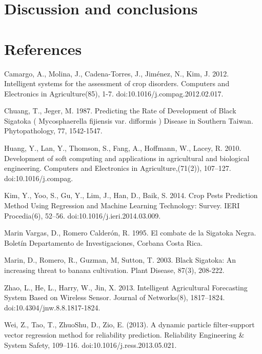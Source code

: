 \documentclass[review]{elsarticle}
\begin{document}
\section{Discussion and conclusions}

\section{References}

\begin{thebibliography}{1}


 Camargo, A., Molina, J., Cadena-Torres, J., Jiménez, N., Kim, J. 2012. Intelligent systems for the assessment of crop disorders. Computers and Electronics in Agriculture(85), 1-7. doi:10.1016/j.compag.2012.02.017.

 Chuang, T., Jeger, M. 1987. Predicting the Rate of Development of Black Sigatoka ( Mycosphaerella fijiensis var. difformis ) Disease in Southern Taiwan. Phytopathology, 77, 1542-1547.

 Huang, Y., Lan, Y., Thomson, S., Fang, A., Hoffmann, W., Lacey, R. 2010. Development of soft computing and applications in agricultural and biological engineering. Computers and Electronics in Agriculture,(71(2)), 107–127. doi:10.1016/j.compag.

 Kim, Y., Yoo, S., Gu, Y., Lim, J., Han, D.,  Baik, S. 2014. Crop Pests Prediction Method Using Regression and Machine Learning Technology: Survey. IERI Procedia(6), 52–56. doi:10.1016/j.ieri.2014.03.009.

 Marin Vargas, D., Romero Calderón, R. 1995. El combate de la Sigatoka Negra. Boletín Departamento de Investigaciones, Corbana Costa Rica.


 Marin, D., Romero, R., Guzman, M, Sutton, T. 2003. Black Sigatoka: An increasing threat to banana cultivation. Plant Disease, 87(3), 208-222.


Zhao, L., He, L., Harry, W., Jin, X. 2013. Intelligent Agricultural Forecasting System Based on Wireless Sensor. Journal of Networks(8), 1817–1824. doi:10.4304/jnw.8.8.1817-1824.

 Wei, Z., Tao, T., ZhuoShu, D.,  Zio, E. (2013). A dynamic particle filter-support vector regression method for reliability prediction. Reliability Engineering \& System Safety, 109–116. doi:10.1016/j.ress.2013.05.021.


\end{thebibliography}
\end{document}
